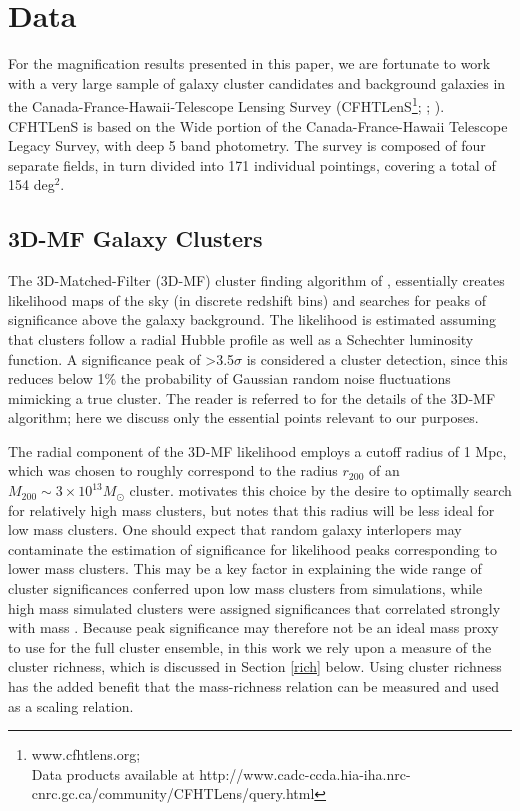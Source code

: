 
\section{Data}
\label{data}
For the magnification results presented in this paper, we are fortunate to work with a very large sample of galaxy cluster candidates and background galaxies in the Canada-France-Hawaii-Telescope Lensing Survey (CFHTLenS\footnote[1]{www.cfhtlens.org; \\Data products available at http://www.cadc-ccda.hia-iha.nrc-cnrc.gc.ca/\-community/\-CFHTLens/\-query.html}; \citet{Erben13}; \citet{Hildebrandt12}). CFHTLenS is based on the Wide portion of the Canada-France-Hawaii Telescope Legacy Survey, with deep 5 band photometry. The survey is composed of four separate fields, in turn divided into 171 individual pointings, covering a total of 154 deg$^2$.

\subsection{3D-MF Galaxy Clusters}
\label{clusters}
The 3D-Matched-Filter (3D-MF) cluster finding algorithm of \citet{Milkeraitis10}, essentially creates likelihood maps of the sky (in discrete redshift bins) and searches for peaks of significance above the galaxy background. The likelihood is estimated assuming that clusters follow a radial Hubble profile as well as a Schechter luminosity function. A significance peak of \textgreater 3.5$\sigma$ is considered a cluster detection, since this reduces below 1\% the probability of Gaussian random noise fluctuations mimicking a true cluster. The reader is referred to \citet{Milkeraitis10} for the details of the 3D-MF algorithm; here we discuss only the essential points relevant to our purposes. 

The radial component of the 3D-MF likelihood employs a cutoff radius of 1 Mpc, which was chosen to roughly correspond to the radius $r_{200}$ of an $M_{200} \sim 3 \times 10^{13} M_{\odot}$ cluster. \citet{Milkeraitis10} motivates this choice by the desire to optimally search for relatively high mass clusters, but notes that this radius will be less ideal for low mass clusters. One should expect that random galaxy interlopers may contaminate the estimation of significance for likelihood peaks corresponding to lower mass clusters. This may be a key factor in explaining the wide range of cluster significances conferred upon low mass clusters from simulations, while high mass simulated clusters were assigned significances that correlated strongly with mass \citep[see Figure 10 in][]{Milkeraitis10}. Because peak significance may therefore not be an ideal mass proxy to use for the full cluster ensemble, in this work we rely upon a measure of the cluster richness, which is discussed in Section \ref{rich} below. Using cluster richness has the added benefit that the mass-richness relation can be measured and used as a scaling relation.

